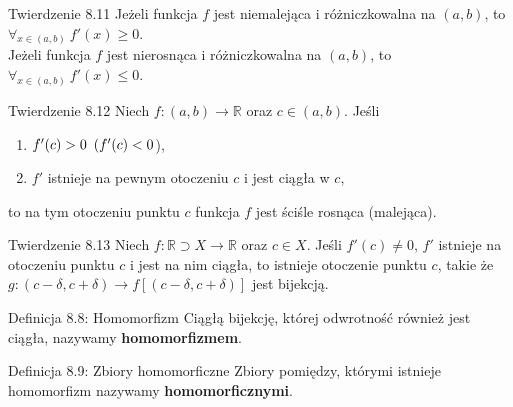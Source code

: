 \documentclass{article}
\newcommand{\hquad}{\mkern9mu}
\newcommand{\R}{\mathbb{R}}
\begin{document}
\begin{twier}{Twierdzenie 8.11}
    Jeżeli funkcja $f$ jest niemalejąca i różniczkowalna na $(a,b)$, to $\forall_{x\in(a,b)}\ f'(x)\ge0$.\\
    Jeżeli funkcja $f$ jest nierosnąca i różniczkowalna na $(a,b)$, to $\forall_{x\in(a,b)}\ f'(x)\le0$.
\end{twier}

\begin{twier}{Twierdzenie 8.12}
    Niech $f:(a,b)\to\R$ oraz $c\in(a,b)$. Jeśli 
    \begin{enumerate}
        \item $f'(c)>0\hquad (f'(c)<0$),
        \item $f'$ istnieje na pewnym otoczeniu $c$ i jest ciągła w $c$,
    \end{enumerate}
    to na tym otoczeniu punktu $c$ funkcja $f$ jest ściśle rosnąca (malejąca).
\end{twier}

\begin{twier}{Twierdzenie 8.13}
    Niech $f:\R\supset X\to\R$ oraz $c\in X$. Jeśli $f'(c)\neq0$, $f'$ istnieje na otoczeniu punktu $c$ i jest na nim ciągła, to istnieje otoczenie punktu $c$, takie że $g:(c-\delta,c+\delta)\to f[(c-\delta,c+\delta)]$ jest bijekcją.
\end{twier}

\begin{defr}{Definicja 8.8: Homomorfizm}
    Ciągłą bijekcję, której odwrotność również jest ciągła, nazywamy \textbf{homomorfizmem}.
\end{defr}

\begin{defr}{Definicja 8.9: Zbiory homomorficzne}
    Zbiory pomiędzy, którymi istnieje homomorfizm nazywamy \textbf{homomorficznymi}.
\end{defr}
\end{document}
